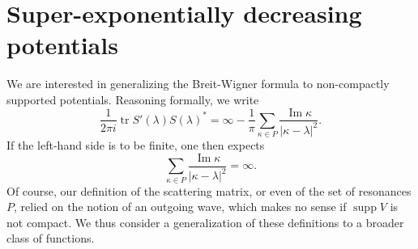 \documentclass[12pt]{report}
\DeclareMathOperator{\supp}{supp}
\renewcommand{\Im}{\operatorname{Im}}
\newcommand{\tr}{\operatorname{tr}}
\theoremstyle{definition}
\begin{document}








\chapter{Super-exponentially decreasing potentials}
We are interested in generalizing the Breit-Wigner formula to non-compactly supported potentials. Reasoning formally, we write
$$\frac{1}{2\pi i}\tr S'(\lambda)S(\lambda)^* = \infty - \frac{1}{\pi} \sum_{\kappa \in P} \frac{\Im \kappa}{|\kappa - \lambda|^2}.$$
If the left-hand side is to be finite, one then expects
$$\sum_{\kappa \in P} \frac{\Im \kappa}{|\kappa - \lambda|^2} = \infty.$$
Of course, our definition of the scattering matrix, or even of the set of resonances $P$, relied on the notion of an outgoing wave, which makes no sense if $\supp V$ is not compact. We thus consider a generalization of these definitions to a broader class of functions.
\end{document}
